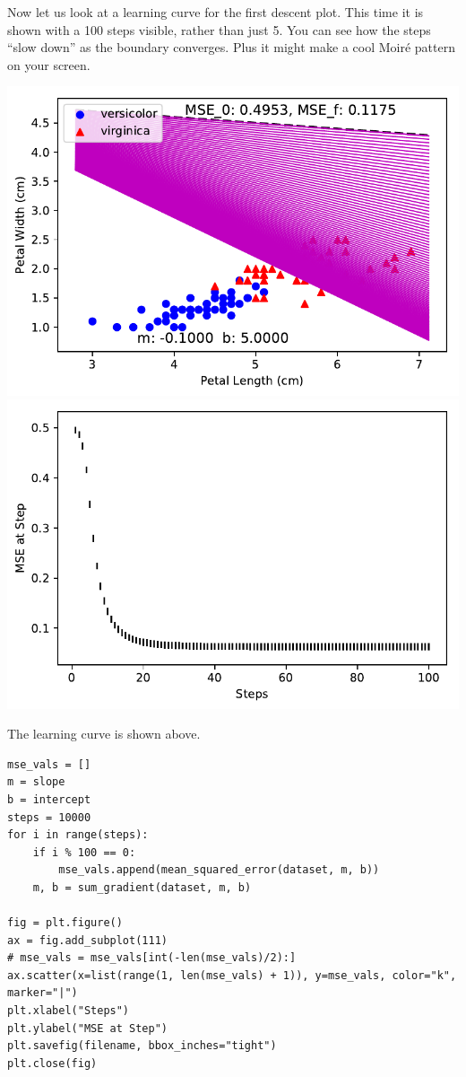 \documentclass[letterpaper]{article}
\begin{document}
Now let us look at a learning curve for the first descent plot. This time it
is shown with a 100 steps visible, rather than just 5. You can see how the steps
``slow down'' as the boundary converges. Plus it might make a cool Moiré pattern
on your screen.
\begin{center}
\includegraphics{plot_3b_1.pdf}
\includegraphics{plot_3b_2.pdf}
\end{center}
The learning curve is shown above.
\begin{verbatim}
mse_vals = []
m = slope
b = intercept
steps = 10000
for i in range(steps):
    if i % 100 == 0:
        mse_vals.append(mean_squared_error(dataset, m, b))
    m, b = sum_gradient(dataset, m, b)

fig = plt.figure()
ax = fig.add_subplot(111)
# mse_vals = mse_vals[int(-len(mse_vals)/2):]
ax.scatter(x=list(range(1, len(mse_vals) + 1)), y=mse_vals, color="k", marker="|")
plt.xlabel("Steps")
plt.ylabel("MSE at Step")
plt.savefig(filename, bbox_inches="tight")
plt.close(fig)
\end{verbatim}
\end{document}
